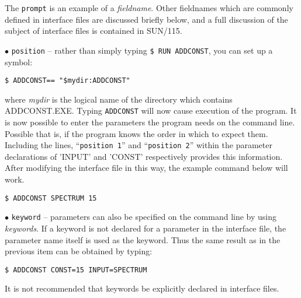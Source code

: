\documentclass[twoside,11pt]{article}
\renewcommand{\_}{{\tt\char'137}}
\newcommand{\xref}[3]{#1}
\begin{document}
The {\tt prompt} is an example of a {\sl fieldname}.
Other fieldnames which are commonly defined in interface files are
discussed briefly below,
and a full discussion of
the subject of interface files is contained in \xref{SUN/115}{sun115}{}.
\begin{description}
\item{$\bullet$ \tt position} --
rather than simply typing {\tt \$ RUN ADDCONST}, you can set up a symbol:
\begin{verbatim}
$ ADDCONST== "$mydir:ADDCONST"
\end{verbatim}
where {\sl mydir\/} is the logical name of the directory which contains
ADDCONST.EXE.
Typing {\tt ADDCONST} will now cause execution of the program.
It is now possible to enter the parameters the program needs on the
command line.
Possible that is, if the program knows the order in which to expect them.
Including the lines, ``{\tt position 1}'' and ``{\tt position 2}'' within the
parameter declarations of 'INPUT' and 'CONST' respectively  provides this
information.
After 	modifying the interface file in this way, the example command
below will work.
\begin{verbatim}
$ ADDCONST SPECTRUM 15
\end{verbatim}

\item{$\bullet$ \tt keyword} -- parameters can also be specified on
the command line by using {\sl keywords}.
If a keyword is not declared for a parameter in the interface file,
the parameter name itself is used as the keyword.
Thus the same result as in the previous item can be obtained by typing:
\begin{verbatim}
$ ADDCONST CONST=15 INPUT=SPECTRUM
\end{verbatim}
It is not recommended that keywords be explicitly declared in interface
files.


\end{description}
\end{document}
